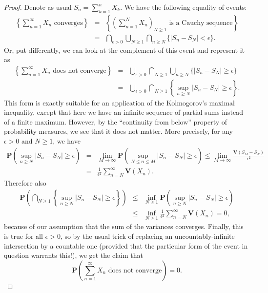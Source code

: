 \documentclass[12pt]{article}
\newcommand{\prob}{\mathbf{P}}
\newcommand{\var}{\mathbf{V}}
\theoremstyle{example}
\begin{document}
\begin{proof} Denote as usual $S_n = \sum_{k=1}^n X_k$. We have the following equality of events:
\begin{eqnarray*}
\left\{ \sum_{n=1}^\infty X_n\textrm{ converges}
\right\}
&=&
\left\{ \left(\sum_{n=1}^N X_n\right)_{N\ge 1} \textrm{ is a Cauchy sequence}
\right\}
\\ &=&
\bigcap_{\epsilon>0}
\bigcup_{N\ge 1}
\bigcap_{n\ge N}
\Big\{
|S_n-S_N|<\epsilon
\Big\}.
\end{eqnarray*}
Or, put differently, we can look at the complement of this event and represent it as
\begin{eqnarray*}
\left\{ \sum_{n=1}^\infty X_n\textrm{ does not converge}
\right\}
&=&
\bigcup_{\epsilon>0}
\bigcap_{N\ge 1}
\bigcup_{n\ge N}
\Big\{
|S_n-S_N|\ge\epsilon
\Big\}
\\ &=&
\bigcup_{\epsilon>0}
\bigcap_{N\ge 1}
\left\{ \sup_{n\ge N}
|S_n-S_N|\ge\epsilon
\right\}.
\end{eqnarray*}
This form is exactly suitable for an application of the Kolmogorov's maximal inequality, except that here we have an infinite sequence of partial sums instead of a finite maximum. However, by the ``continuity from below'' property of probability measures, we see that it does not matter. More precisely, for any $\epsilon>0$ and $N\ge 1$, we have
\begin{eqnarray*}
 \prob\left(
 \sup_{n\ge N}
|S_n-S_N|\ge\epsilon
\right) &=& \lim_{M\to\infty} \prob\left(
 \sup_{N\le n\le M}
|S_n-S_N|\ge\epsilon
\right) \le \lim_{M\to\infty} \frac{\var(S_M-S_N)}{\epsilon^2} \\ &=& \frac{1}{\epsilon^2} \sum_{n=N}^\infty \var(X_n).
\end{eqnarray*}
Therefore also
\begin{eqnarray*}
 \prob\left( \bigcap_{N\ge 1} \left\{
 \sup_{n\ge N}
|S_n-S_N|\ge\epsilon
\right\} \right) &\le& \inf_{N\ge 1}
 \prob\left(
 \sup_{n\ge N}
|S_n-S_N|\ge\epsilon
\right) \\ &\le&
\inf_{N\ge 1} \frac{1}{\epsilon^2} \sum_{n=N}^\infty \var(X_n) = 0,
\end{eqnarray*}
because of our assumption that the sum of the variances converges. Finally, this is true for all $\epsilon>0$, so by the usual trick of replacing an uncountably-infinite intersection by a countable one (provided that the particular form of the event in question warrants this!), we get the claim that
$$ \prob\left(\sum_{n=1}^\infty X_n\textrm{ does not converge}\right) = 0. $$
\end{proof}
\end{document}
